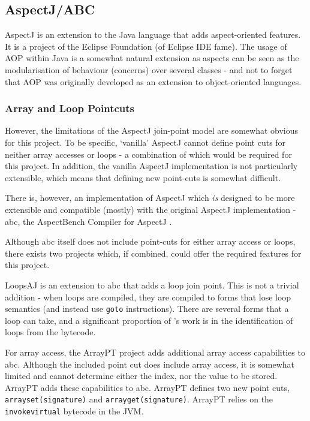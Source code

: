         \subsection{AspectJ/ABC} \label{sec:instrumentation/aop/aspectj}
        AspectJ \citep{Kiczales2001} is an extension to the Java language that adds aspect-oriented features. It is a project of the Eclipse Foundation (of Eclipse IDE fame). The usage of AOP within Java is a somewhat natural extension as aspects can be seen as the modularisation of behaviour (concerns) over several classes - and not to forget that AOP was originally developed as an extension to object-oriented languages.

                \subsubsection{Array and Loop Pointcuts} \label{sec:instrumentation/aop/aspectj/arrayloop}
                However, the limitations of the AspectJ join-point model are somewhat obvious for this project. To be specific, `vanilla' AspectJ cannot define point cuts for neither array accesses or loops - a combination of which would be required for this project. In addition, the vanilla AspectJ implementation is not particularly extensible, which means that defining new point-cuts is somewhat difficult.

                There is, however, an implementation of AspectJ which \emph{is} designed to be more extensible and compatible (mostly) with the original AspectJ implementation - abc, the AspectBench Compiler for AspectJ \citep{Allan2005}.

                Although abc itself does not include point-cuts for either array access or loops, there exists two projects which, if combined, could offer the required features for this project.

                LoopsAJ \citep{Harbulot2005} is an extension to abc that adds a loop join point. This is not a trivial addition - when loops are compiled, they are compiled to forms that lose loop semantics (and instead use \texttt{goto} instructions). There are several forms that a loop can take, and a significant proportion of \citeauthor{Harbulot2005}'s work is in the identification of loops from the bytecode.

                For array access, the ArrayPT project \citep{Chen2007} adds additional array access capabilities to abc. Although the included point cut does include array access, it is somewhat limited and cannot determine either the index, nor the value to be stored. ArrayPT adds these capabilities to abc. ArrayPT defines two new point cuts, \texttt{arrayset(signature)} and \texttt{arrayget(signature)}. ArrayPT relies on the \texttt{invokevirtual} bytecode in the JVM.

